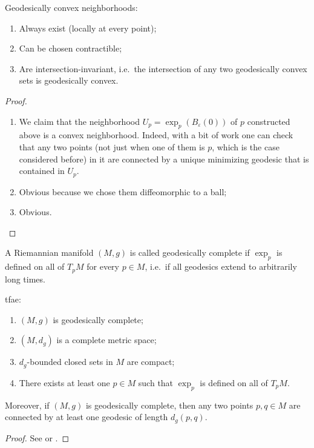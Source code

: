 \begin{thm}\label{geodesically convex nbhds thm}
    Geodesically convex neighborhoods:
    \begin{enumerate}
        \item Always exist (locally at every point);
        \item Can be chosen contractible;
        \item Are intersection-invariant, i.e.\ the intersection of any two geodesically convex sets is geodesically convex.
    \end{enumerate}
\end{thm}
\begin{proof}
    \begin{enumerate}
        \item We claim that the neighborhood $U_p=\exp_p(B_\varepsilon(0))$ of $p$ constructed above is a convex neighborhood. Indeed, with a bit of work one can check that any two points (not just when one of them is $p$, which is the case considered before) in it are connected by a unique minimizing geodesic that is contained in $U_p$.
        \item Obvious because we chose them diffeomorphic to a ball;
        \item Obvious.
    \end{enumerate}
\end{proof}


\begin{defn}
    A Riemannian manifold $(M,g)$ is called geodesically complete if $\exp_p$ is defined on all of $T_pM$ for every $p\in M$, i.e.\ if all geodesics extend to arbitrarily long times.
\end{defn}

\begin{thm}
    \gls{tfae}:
    \begin{enumerate}
        \item $(M,g)$ is geodesically complete;
        \item $(M,d_g)$ is a complete metric space;
        \item $d_g$-bounded closed sets in $M$ are compact;
        \item There exists at least one $p\in M$ such that $\exp_p$ is defined on all of $T_p M$.
    \end{enumerate}
    Moreover, if $(M,g)$ is geodesically complete, then any two points $p,q\in M$ are connected by at least one geodesic of length $d_g(p,q)$.
\end{thm}
\begin{proof}
    See \cite[Thm. 1.7.1]{Jost} or \cite[Thm. 10.9]{Milnor}.
\end{proof}



